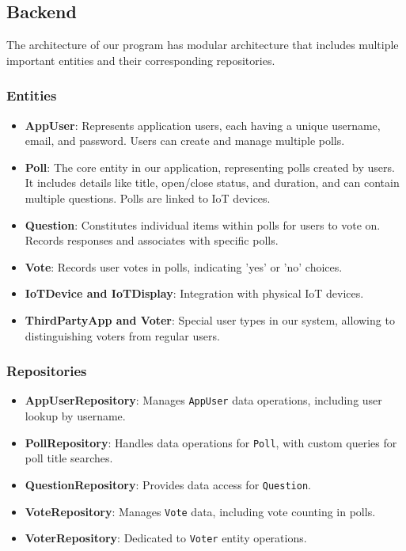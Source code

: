 \subsection{Backend}
The architecture of our program has modular architecture that includes multiple important entities and their corresponding repositories.

\subsubsection{Entities}
\begin{itemize}
    \item \textbf{AppUser}: Represents application users, each having a unique username, email, and password. Users can create and manage multiple polls.
    \item \textbf{Poll}: The core entity in our application, representing polls created by users. It includes details like title, open/close status, and duration, and can contain multiple questions. Polls are linked to IoT devices.
    \item \textbf{Question}: Constitutes individual items within polls for users to vote on. Records responses and associates with specific polls.
    \item \textbf{Vote}: Records user votes in polls, indicating 'yes' or 'no' choices.
    \item \textbf{IoTDevice and IoTDisplay}: Integration with physical IoT devices.
    \item \textbf{ThirdPartyApp and Voter}: Special user types in our system, allowing to distinguishing voters from regular users.
\end{itemize}

\subsubsection{Repositories}
\begin{itemize}
    \item \textbf{AppUserRepository}: Manages \texttt{AppUser} data operations, including user lookup by username.
    \item \textbf{PollRepository}: Handles data operations for \texttt{Poll}, with custom queries for poll title searches.
    \item \textbf{QuestionRepository}: Provides data access for \texttt{Question}.
    \item \textbf{VoteRepository}: Manages \texttt{Vote} data, including vote counting in polls.
    \item \textbf{VoterRepository}: Dedicated to \texttt{Voter} entity operations.
\end{itemize}

